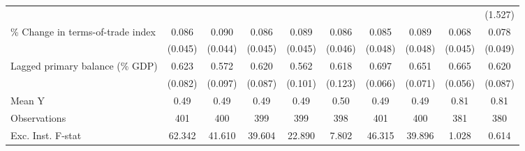 {\begin{tabular}{l*{9}{c}}
                    &                     &                     &                     &                     &                     &                     &                     &                     &     (1.527)         \\
\addlinespace
\% Change in terms-of-trade index&       0.086\sym{*}  &       0.090\sym{**} &       0.086\sym{*}  &       0.089\sym{**} &       0.086\sym{*}  &       0.085\sym{*}  &       0.089\sym{*}  &       0.068         &       0.078         \\
                    &     (0.045)         &     (0.044)         &     (0.045)         &     (0.045)         &     (0.046)         &     (0.048)         &     (0.048)         &     (0.045)         &     (0.049)         \\
\addlinespace
Lagged primary balance (\% GDP)&       0.623\sym{***}&       0.572\sym{***}&       0.620\sym{***}&       0.562\sym{***}&       0.618\sym{***}&       0.697\sym{***}&       0.651\sym{***}&       0.665\sym{***}&       0.620\sym{***}\\
                    &     (0.082)         &     (0.097)         &     (0.087)         &     (0.101)         &     (0.123)         &     (0.066)         &     (0.071)         &     (0.056)         &     (0.087)         \\
\midrule
Mean Y              &        0.49         &        0.49         &        0.49         &        0.49         &        0.50         &        0.49         &        0.49         &        0.81         &        0.81         \\
Observations        &         401         &         400         &         399         &         399         &         398         &         401         &         400         &         381         &         380         \\
Exc. Inst. F-stat   &      62.342         &      41.610         &      39.604         &      22.890         &       7.802         &      46.315         &      39.896         &       1.028         &       0.614         \\
\bottomrule
\end{tabular}
}
